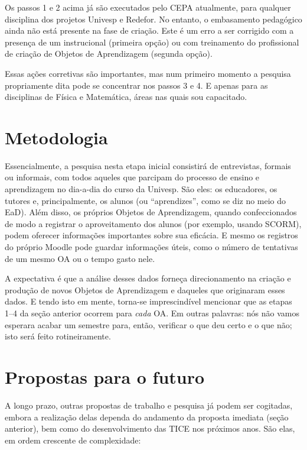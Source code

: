 Os passos 1 e 2 acima já são executados pelo CEPA atualmente, para qualquer disciplina dos projetos Univesp e Redefor. No entanto, o embasamento pedagógico ainda não está presente na fase de criação. Este é um erro a ser corrigido com a presença de um  instrucional (primeira opção) ou com treinamento do profissional de criação de Objetos de Aprendizagem (segunda opção).

Essas ações corretivas são importantes, mas num primeiro momento a pesquisa propriamente dita pode se concentrar nos passos 3 e 4. E apenas para as disciplinas de Física e Matemática, áreas nas quais sou capacitado.

\section{Metodologia}

Essencialmente, a pesquisa nesta etapa inicial consistirá de entrevistas, formais ou informais, com todos aqueles que parcipam do processo de ensino e aprendizagem no dia-a-dia do curso da Univesp. São eles: os educadores, os tutores e, principalmente, os alunos (ou ``aprendizes'', como se diz no meio do EaD). Além disso, os próprios Objetos de Aprendizagem, quando confeccionados de modo a registrar o aproveitamento dos alunos (por exemplo, usando SCORM), podem oferecer informações importantes sobre sua eficácia. E mesmo os registros do próprio Moodle pode guardar informações úteis, como o número de tentativas de um mesmo OA ou o tempo gasto nele.

A expectativa é que a análise desses dados forneça direcionamento na criação e produção de novos Objetos de Aprendizagem e daqueles que originaram esses dados. E tendo isto em mente, torna-se imprescindível mencionar que as etapas 1--4 da seção anterior ocorrem para \emph{cada} OA. Em outras palavras: nós não vamos esperara acabar um semestre para, então, verificar o que deu certo e o que não; isto será feito rotineiramente.

\section{Propostas para o futuro}

A longo prazo, outras propostas de trabalho e pesquisa já podem ser cogitadas, embora a realização delas dependa do andamento da proposta imediata (seção anterior), bem como do desenvolvimento das TICE nos próximos anos. São elas, em ordem crescente de complexidade:

